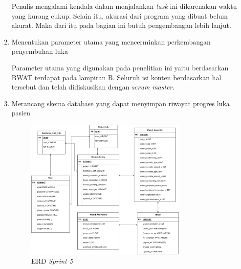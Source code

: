 \begin{enumerate}
Penulis mengalami kendala dalam menjalankan \textit{task} ini dikarenakan waktu yang kurang cukup. Selain itu, akurasi dari program yang dibuat belum akurat. Maka dari itu pada bagian ini butuh pengembangan lebih lanjut.
\item Menentukan parameter utama yang mencerminkan perkembangan penyembuhan luka

Parameter utama yang digunakan pada penelitian ini yaitu berdasarkan BWAT terdapat pada lampiran B. Seluruh isi konten berdasarkan hal tersebut dan telah didiskusikan dengan \textit{scrum master}.
\item Merancang skema database yang dapat menyimpan riwayat progres luka pasien

	\begin{figure}[H]
		\centering
		\includegraphics[keepaspectratio, width=8cm]{gambar/erd_sprint_5}
		\caption{ERD \textit{Sprint-5}}
		\label{gambar:erd_sprint_5}
	\end{figure}
\end{enumerate}

